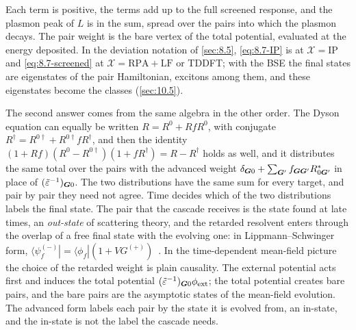 \noindent Each term is positive, the terms add up to the full screened response, and the plasmon peak of $L$ is in the sum, spread over the pairs into which the plasmon decays. The pair weight is the bare vertex of the total potential, evaluated at the energy deposited. In the deviation notation of \cref{sec:8.5}, \cref{eq:8.7-IP} is at $\mathcal{X} = \mathrm{IP}$ and \cref{eq:8.7-screened} at $\mathcal{X} = \mathrm{RPA} + \mathrm{LF}$ or TDDFT; with the BSE the final states are eigenstates of the pair Hamiltonian, excitons among them, and these eigenstates become the classes (\cref{sec:10.5}).

The second answer comes from the same algebra in the other order. The Dyson equation can equally be written $R = R^0 + RfR^0$, with conjugate $R^\dagger = R^{0\dagger} + R^{0\dagger}fR^\dagger$, and then the identity $(1 + Rf)(R^0 - R^{0\dagger})(1 + fR^\dagger) = R - R^\dagger$ holds as well, and it distributes the same total over the pairs with the advanced weight $\delta_{\bm{G}0} + \sum_{\bm{G}'}f_{\bm{G}\bm{G}'}R^*_{0\bm{G}'}$ in place of $(\tilde\varepsilon^{-1})_{\bm{G}0}$. The two distributions have the same sum for every target, and pair by pair they need not agree. Time decides which of the two distributions labels the final state. The pair that the cascade receives is the state found at late times, an \emph{out-state} of scattering theory, and the retarded resolvent enters through the overlap of a free final state with the evolving one: in Lippmann--Schwinger form, $\langle\psi_f^{(-)}| = \langle\phi_f|(1 + VG^{(+)})$~\cite[Chap.~6]{sakurai2017modern}. In the time-dependent mean-field picture the choice of the retarded weight is plain causality. The external potential acts first and induces the total potential $(\tilde\varepsilon^{-1})_{\bm{G}0}\phi_{\mathrm{ext}}$; the total potential creates bare pairs, and the bare pairs are the asymptotic states of the mean-field evolution. The advanced form labels each pair by the state it is evolved from, an in-state, and the in-state is not the label the cascade needs.

